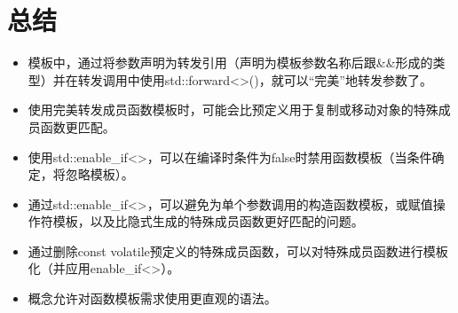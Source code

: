 \section{总结}

\begin{itemize}
\item 
模板中，通过将参数声明为转发引用（声明为模板参数名称后跟\&\&形成的类型）并在转发调用中使用std::forward<>()，就可以“完美”地转发参数了。

\item 
使用完美转发成员函数模板时，可能会比预定义用于复制或移动对象的特殊成员函数更匹配。

\item 
使用std::enable\_if<>，可以在编译时条件为false时禁用函数模板（当条件确定，将忽略模板）。

\item 
通过std::enable\_if<>，可以避免为单个参数调用的构造函数模板，或赋值操作符模板，以及比隐式生成的特殊成员函数更好匹配的问题。

\item 
通过删除const volatile预定义的特殊成员函数，可以对特殊成员函数进行模板化（并应用enable\_if<>）。

\item 
概念允许对函数模板需求使用更直观的语法。
\end{itemize}